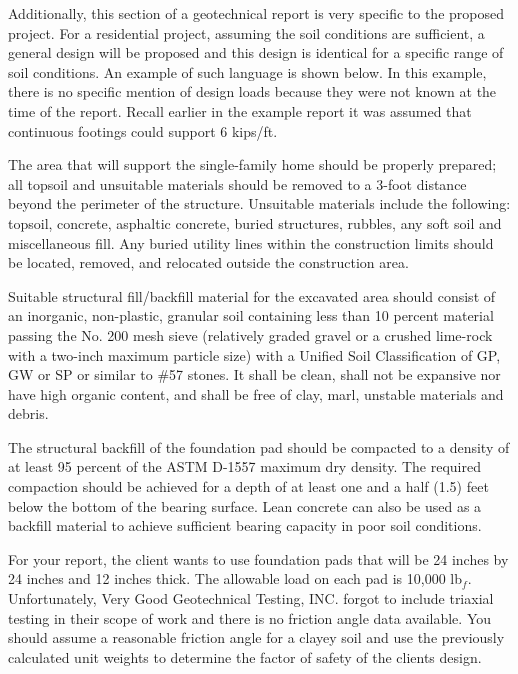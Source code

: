 \documentclass[12pt]{article}
\begin{document}
Additionally, this section of a geotechnical report is very specific to the proposed project. For a residential project, assuming the soil conditions are sufficient, a general design will be proposed and this design is identical for a specific range of soil conditions. An example of such language is shown below. In this example, there is no specific mention of design loads because they were not known at the time of the report. Recall earlier in the example report it was assumed that continuous footings could support 6 kips/ft.

\begin{letter}
The area that will support the single-family home should be properly prepared; all topsoil and unsuitable materials should be removed to a 3-foot distance beyond the perimeter of the structure. Unsuitable materials include the following: topsoil, concrete, asphaltic concrete, buried structures, rubbles, any soft soil and miscellaneous fill. Any buried utility lines within the construction limits should be located, removed, and relocated outside the construction area.

Suitable structural fill/backfill material for the excavated area should consist of an inorganic, non-plastic, granular soil containing less than 10 percent material passing the No. 200 mesh sieve (relatively graded gravel or a crushed lime-rock with a two-inch maximum particle size) with a Unified Soil Classification of GP, GW or SP or similar to \#57 stones. It shall be clean, shall not be expansive nor have high organic content, and shall be free of clay, marl, unstable materials and debris.

The structural backfill of the foundation pad should be compacted to a density of at least 95 percent of the ASTM D-1557 maximum dry density. The required compaction should be achieved for a depth of at least one and a half (1.5) feet below the bottom of the bearing surface. Lean concrete can also be used as a backfill material to achieve sufficient bearing capacity in poor soil conditions.
\end{letter}

For your report, the client wants to use foundation pads that will be 24 inches by 24 inches and 12 inches thick. The allowable load on each pad is 10,000 lb$_f$. Unfortunately, Very Good Geotechnical Testing, INC. forgot to include triaxial testing in their scope of work and there is no friction angle data available. You should assume a reasonable friction angle for a clayey soil and use the previously calculated unit weights to determine the factor of safety of the clients design.
\end{document}
